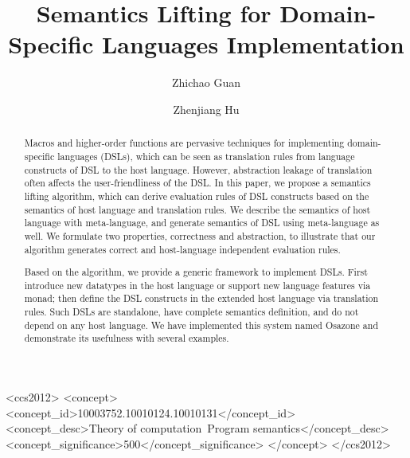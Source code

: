 \documentclass[acmsmall,manuscript,screen,review,anonymous]{acmart}
\begin{document}
\title{Semantics Lifting for Domain-Specific Languages Implementation}

\author{Zhichao Guan}
\author{Zhenjiang Hu}
\renewcommand{\shortauthors}{Trovato et al.}

\begin{abstract}
Macros and higher-order functions are pervasive techniques for implementing domain-specific languages (DSLs),
 which can be seen as translation rules from language constructs of DSL to the host language.
However, abstraction leakage of translation often affects the user-friendliness of the DSL.
In this paper, we propose a semantics lifting algorithm,
 which can derive evaluation rules of DSL constructs based on the semantics of host language and translation rules.
We describe the semantics of host language with meta-language,
 and generate semantics of DSL using meta-language as well.
We formulate two properties, correctness and abstraction,
 to illustrate that our algorithm generates correct and host-language independent evaluation rules.

Based on the algorithm, we provide a generic framework to implement DSLs.
First introduce new datatypes in the host language or support new language features via monad;
 then define the DSL constructs in the extended host language via translation rules.
Such DSLs are standalone, have complete semantics definition,
 and do not depend on any host language.
We have implemented this system named Osazone and demonstrate its usefulness with several examples.
\end{abstract}

\begin{CCSXML}
<ccs2012>
  <concept>
    <concept_id>10003752.10010124.10010131</concept_id>
    <concept_desc>Theory of computation~Program semantics</concept_desc>
    <concept_significance>500</concept_significance>
  </concept>
</ccs2012>
\end{CCSXML}
  
\end{document}
